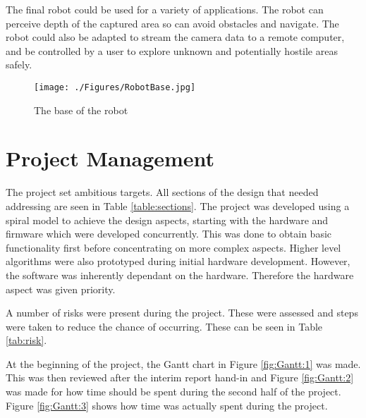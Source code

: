 The final robot could be used for a variety of applications. The robot can perceive depth of the captured area so can avoid obstacles and navigate. The robot could also be adapted to stream the camera data to a remote computer, and be controlled by a user to explore unknown and potentially hostile areas safely. 

\begin{figure}
\centering
\texttt{[image: ./Figures/RobotBase.jpg]}
\caption{The base of the robot}
\label{fig:RobotBase}
\end{figure}

\section{Project Management}


The project set ambitious targets. All sections of the design that needed addressing are seen in Table \ref{table:sections}. The project was developed using a spiral model to achieve the design aspects, starting with the hardware and firmware which were developed concurrently. This was done to obtain basic functionality first before concentrating on more complex aspects. Higher level algorithms were also prototyped during initial hardware development. However, the software was inherently dependant on the hardware. Therefore the hardware aspect was given priority. 

A number of risks were present during the project. These were assessed and steps were taken to reduce the chance of occurring. These can be seen in Table \ref{tab:risk}. 

At the beginning of the project, the Gantt chart in Figure \ref{fig:Gantt:1} was made. This was then reviewed after the interim report hand-in and Figure \ref{fig:Gantt:2} was made for how time should be spent during the second half of the project. Figure \ref{fig:Gantt:3} shows how time was actually spent during the project. 

